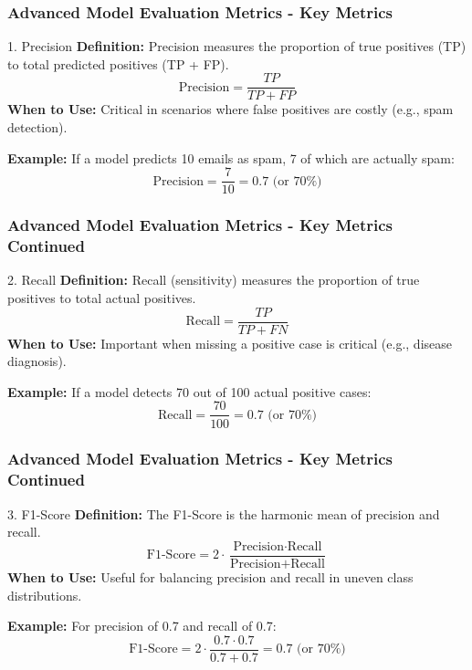 \documentclass[aspectratio=169]{beamer}
\begin{document}
\begin{frame}[fragile]
    \frametitle{Advanced Model Evaluation Metrics - Key Metrics}
    \begin{block}{1. Precision}
        \textbf{Definition:} Precision measures the proportion of true positives (TP) to total predicted positives (TP + FP).
        \begin{equation}
            \text{Precision} = \frac{TP}{TP + FP}
        \end{equation}
        \textbf{When to Use:} Critical in scenarios where false positives are costly (e.g., spam detection).

        \textbf{Example:} If a model predicts 10 emails as spam, 7 of which are actually spam:
        \begin{equation}
            \text{Precision} = \frac{7}{10} = 0.7 \text{ (or 70\%)}
        \end{equation}
    \end{block}
\end{frame}

\begin{frame}[fragile]
    \frametitle{Advanced Model Evaluation Metrics - Key Metrics Continued}
    \begin{block}{2. Recall}
        \textbf{Definition:} Recall (sensitivity) measures the proportion of true positives to total actual positives.
        \begin{equation}
            \text{Recall} = \frac{TP}{TP + FN}
        \end{equation}
        \textbf{When to Use:} Important when missing a positive case is critical (e.g., disease diagnosis).

        \textbf{Example:} If a model detects 70 out of 100 actual positive cases:
        \begin{equation}
            \text{Recall} = \frac{70}{100} = 0.7 \text{ (or 70\%)}
        \end{equation}
    \end{block}
\end{frame}

\begin{frame}[fragile]
    \frametitle{Advanced Model Evaluation Metrics - Key Metrics Continued}
    \begin{block}{3. F1-Score}
        \textbf{Definition:} The F1-Score is the harmonic mean of precision and recall.
        \begin{equation}
            \text{F1-Score} = 2 \cdot \frac{\text{Precision} \cdot \text{Recall}}{\text{Precision} + \text{Recall}}
        \end{equation}
        \textbf{When to Use:} Useful for balancing precision and recall in uneven class distributions.

        \textbf{Example:} For precision of 0.7 and recall of 0.7:
        \begin{equation}
            \text{F1-Score} = 2 \cdot \frac{0.7 \cdot 0.7}{0.7 + 0.7} = 0.7 \text{ (or 70\%)}
        \end{equation}
    \end{block}
\end{frame}
\end{document}
